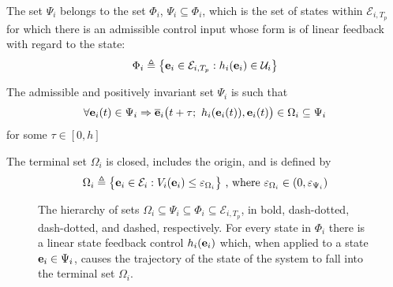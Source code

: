 \begin{bw_box}
  \begin{assumption}
  \label{ass:phi_psi}
  The set $\Psi_i$ belongs to the set $\Phi_i$, $\Psi_i \subseteq \Phi_i$,
  which is the set of states within $\mathcal{E}_{i,T_p}$ for which there is an
  admissible control input whose form is of linear feedback with regard to the
  state:
  \begin{align}
    \Phi_i \triangleq \big\{\bm{\mathbf{e}}_i \in \mathcal{E}_{i,T_p} : h_i(\bm{\mathbf{e}}_i) \in \mathcal{U}_i \big\}
  \end{align}
  \end{assumption}
\end{bw_box}


\begin{bw_box}
  \begin{assumption}
  \label{ass:psi_omega}
  The admissible and positively invariant set $\Psi_i$ is such that
  \begin{align}
  \forall \bm{\mathbf{e}}_i(t) \in \Psi_i \Rightarrow \overline{\bm{\mathbf{e}}}_i\big(t+\tau;\ h_i(\bm{\mathbf{e}}_i(t)), \bm{\mathbf{e}}_i(t)\big) \in \Omega_i \subseteq \Psi_i
  \end{align}
  for some $\tau \in [0,h]$
  \end{assumption}
\end{bw_box}

\begin{bw_box}
  \begin{assumption}
  \label{ass:omega}
  The terminal set $\Omega_i$ is closed, includes the origin, and is defined by
  \begin{align}
    \Omega_i \triangleq \big\{\bm{\mathbf{e}}_i \in \mathcal{E}_i : V_i(\bm{\mathbf{e}}_i)
      \leq \varepsilon_{\Omega_i}\big\}\ \text{, where } \varepsilon_{\Omega_i} \in (0, \varepsilon_{\Psi_i})
  \end{align}
  \end{assumption}
\end{bw_box}

\begin{figure}[ht!]
  \centering
  
  \caption{The hierarchy of sets
  $\Omega_i \subseteq \Psi_i \subseteq \Phi_i \subseteq \mathcal{E}_{i,T_p}$,
  in bold, dash-dotted, dash-dotted, and dashed, respectively.
  For every state in $\Phi_i$ there is a linear state feedback control
  $h_i(\bm{\mathbf{e}}_i)$ which, when applied to a state
  $\bm{\mathbf{e}}_i \in \Psi_i$, causes the trajectory of the state of the system to
  fall into the terminal set $\Omega_i$.}
\end{figure}


